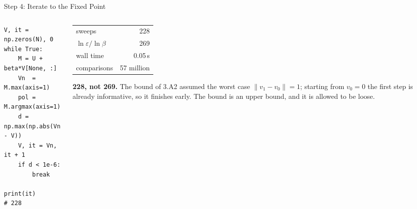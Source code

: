 \begin{frame}[fragile]{Step 4: Iterate to the Fixed Point}
\begin{columns}[T]
\begin{column}{0.53\textwidth}
\begin{lstlisting}
V, it = np.zeros(N), 0
while True:
    M = U + beta*V[None, :]
    Vn  = M.max(axis=1)
    pol = M.argmax(axis=1)
    d = np.max(np.abs(Vn - V))
    V, it = Vn, it + 1
    if d < 1e-6:
        break

print(it)          # 228
\end{lstlisting}
\end{column}
\begin{column}{0.44\textwidth}
\small
\begin{center}\footnotesize
\begin{tabular}{@{}lr@{}}
\toprule
sweeps & 228 \\
$\ln\varepsilon/\ln\beta$ & 269 \\
wall time & 0.05\,s \\
comparisons & 57 million \\
\bottomrule
\end{tabular}
\end{center}
\medskip
\begin{examplebox}\footnotesize
\textbf{228, not 269.} The bound of 3.A2 assumed the worst case $\lVert v_1-v_0\rVert=1$; starting from $v_0=0$ the first step is already informative, so it finishes early. The bound is an upper bound, and it is allowed to be loose.
\end{examplebox}
\end{column}
\end{columns}
\end{frame}

